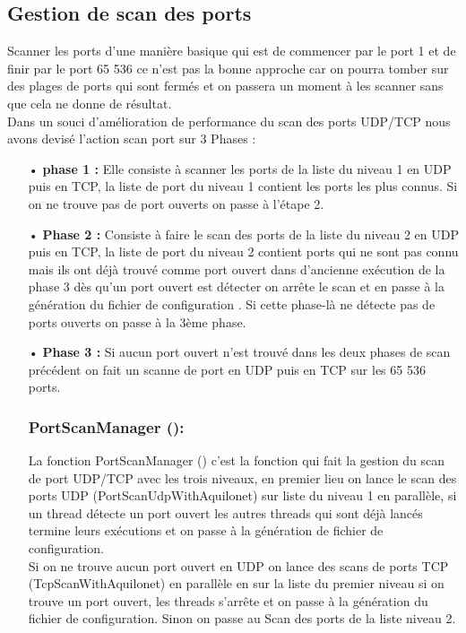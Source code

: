 \documentclass[12pt,a4paper]{article}
\begin{document}
\subsection{Gestion de scan des ports }
Scanner les ports d’une manière basique qui est de commencer par le port 1 et de finir par le port 65 536 ce n’est pas la bonne approche car on pourra tomber sur des plages de ports qui sont fermés et on passera un moment à les scanner sans que cela ne donne de résultat.\\
Dans un souci d’amélioration de performance du scan des ports UDP/TCP nous avons devisé l’action scan port sur 3 Phases : \\
\begin{itemize}
\item[•] \textbf{phase 1 :} 
Elle  consiste à scanner les ports de la liste du niveau 1 en UDP puis en TCP, la liste de port du niveau 1 contient les ports les plus connus.  Si on ne trouve pas de port ouverts on passe à l’étape 2.\\
\item[•] \textbf{Phase 2 : }
Consiste à faire le scan des ports de la liste du niveau 2 en UDP puis en TCP, la liste de port du niveau 2 contient  ports qui  ne sont pas connu mais ils ont déjà trouvé comme port ouvert dans d’ancienne exécution de la phase 3 dès qu’un port ouvert est détecter on arrête le scan et en passe à la génération du fichier de configuration . Si cette phase-là ne détecte pas de ports ouverts on passe à la 3ème phase.\\ 
\item[•] \textbf{Phase 3 :}
Si aucun port ouvert n’est trouvé dans les deux phases de scan précédent on fait un scanne de port en UDP puis en TCP sur les 65 536 ports.\\

\subsubsection{PortScanManager ():}


La fonction PortScanManager () c’est la fonction qui fait la gestion du scan de port UDP/TCP avec les trois niveaux, en premier lieu on lance le scan des ports UDP (PortScanUdpWithAquilonet) sur liste du niveau 1 en parallèle, si un thread détecte un port ouvert les autres threads qui sont déjà lancés termine leurs exécutions et on passe à la génération de fichier de configuration.\\

Si on ne trouve aucun port ouvert en UDP on lance des scans de ports  TCP (TcpScanWithAquilonet) en parallèle en sur la liste du premier niveau si on trouve un port ouvert, les threads s’arrête et on passe à la génération du fichier de configuration. Sinon on passe au Scan des ports de la liste niveau 2.\\


\end{itemize}
\end{document}
